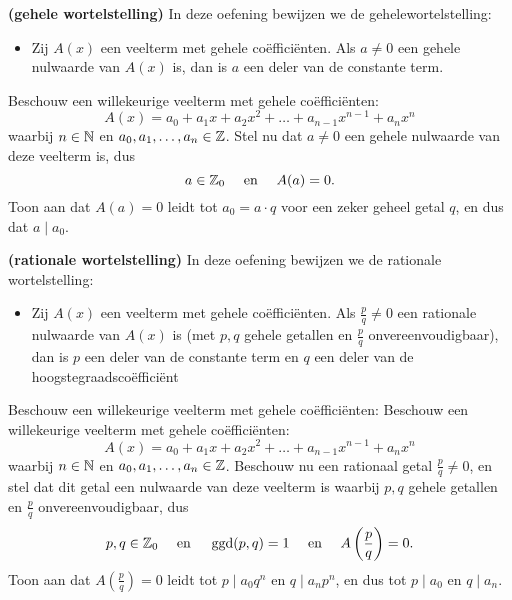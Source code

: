 \documentclass{ximera}
\begin{document}
\begin{Uitbreiding}
\begin{exercise}
{\bf (gehele wortelstelling)} 
In deze oefening bewijzen we de gehelewortelstelling: 
\begin{itemize}
\item[]
Zij \(A(x)\) een veelterm met gehele coëfficiënten. Als \(a \neq 0\) een gehele nulwaarde van \(A(x)\) is, dan is \(a\) een deler van de constante term.
\end{itemize}
Beschouw een willekeurige veelterm met gehele coëfficiënten:
\[
A(x) = a_0 + a_1 x + a_2 x^2 + \dots + a_{n-1} x^{n-1} + a_nx^n
\]
waarbij \( n \in \mathbb{N}\) en \(a_0, a_1, \ldots, a_n \in \mathbb{Z}\). Stel nu dat \(a \neq 0\) een gehele nulwaarde van deze veelterm is, dus
\[
a \in \mathbb{Z}_0 \quad \text{ en } \quad A(a) = 0.
\]
Toon aan dat \(A(a) = 0\) leidt tot \(a_0 = a\cdot q\) voor een zeker geheel getal \(q\), en dus dat \(a \mid a_0\). 
\end{exercise}
\end{Uitbreiding}


\begin{Uitbreiding}
\begin{exercise}\label{oefening:rationalewortelstelling}
{\bf (rationale wortelstelling)} 
In deze oefening bewijzen we de rationale wortelstelling:
\begin{itemize}
\item[]
Zij \(A(x)\) een veelterm met gehele coëfficiënten. Als \(\frac{p}{q} \neq 0\) een rationale nulwaarde van \(A(x)\) is (met \(p,q\) gehele getallen en \(\frac{p}{q}\) onvereenvoudigbaar), dan is \(p\) een deler van de constante term en \(q\) een deler van de hoogstegraadscoëfficiënt  
\end{itemize}
Beschouw een willekeurige veelterm met gehele coëfficiënten:
Beschouw een willekeurige veelterm met gehele coëfficiënten:
\[
A(x) = a_0 + a_1 x + a_2 x^2 + \dots + a_{n-1} x^{n-1} + a_nx^n
\]
waarbij \( n \in \mathbb{N}\) en \(a_0, a_1, \ldots, a_n \in \mathbb{Z}\). Beschouw nu een rationaal getal \(\frac{p}{q} \neq 0\), en stel dat dit getal een nulwaarde van deze veelterm is waarbij \(p,q\) gehele getallen en \(\frac{p}{q}\) onvereenvoudigbaar, dus
\[
p,q \in \mathbb{Z}_0 \quad \text{ en } \quad \operatorname{ggd}(p,q)=1 \quad \text{ en } \quad A\left(\frac{p}{q}\right) = 0.
\]
Toon aan dat \(A\left(\frac{p}{q}\right) = 0\) leidt tot \(p \mid a_0q^n\) en \(q \mid a_n p^n\), en dus tot \(p \mid a_0\) en \(q \mid a_n\).
\end{exercise}
\end{Uitbreiding}
\end{document}
